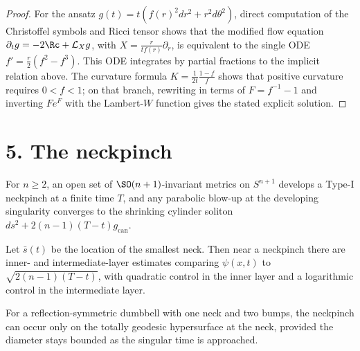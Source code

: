 \begin{proof}
\sketch For the ansatz \(g(t)=t(f(r)^2dr^2+r^2d\theta^2)\), direct computation of the
Christoffel symbols and Ricci tensor shows that the modified flow equation
\(\partial_t g=-2\Rc+\mathcal L_X g\), with
\(X=\frac{r}{tf(r)}\partial_r\), is equivalent to the single ODE
\(f'=\frac r2(f^2-f^3)\). This ODE integrates by partial fractions to the
implicit relation above. The curvature formula
\(K=\frac1{2t}\frac{1-f}{f}\) shows that positive curvature requires
\(0<f<1\); on that branch, rewriting in terms of \(F=f^{-1}-1\) and inverting
\(Fe^F\) with the Lambert-\(W\) function gives the stated explicit solution.
\end{proof}

\section*{5. The neckpinch}

\begin{theorem}
\label{ch02-thm-neckpinch-rigorous}

For \(n\ge 2\), an open set of \(\SO(n+1)\)-invariant metrics on \(S^{n+1}\)
develops a Type-I neckpinch at a finite time \(T\), and any parabolic blow-up
at the developing singularity converges to the shrinking cylinder soliton
\(ds^2+2(n-1)(T-t)g_{\mathrm{can}}\).
\end{theorem}

\begin{theorem}
\label{ch02-thm-neckpinch-asymptotics}

Let \(\bar s(t)\) be the location of the smallest neck. Then near a neckpinch
there are inner- and intermediate-layer estimates comparing \(\psi(x,t)\) to
\(\sqrt{2(n-1)(T-t)}\), with quadratic control in the inner layer and a logarithmic
control in the intermediate layer.
\end{theorem}

\begin{remark}
\label{ch02-rem-single-point-pinching}

For a reflection-symmetric dumbbell with one neck and two bumps, the
neckpinch can occur only on the totally geodesic hypersurface at the neck,
provided the diameter stays bounded as the singular time is approached.
\end{remark}

